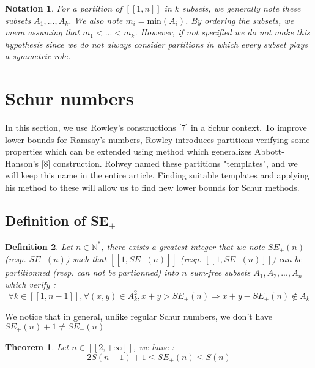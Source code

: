 \documentclass{article}
\newtheorem{definition}{Definition}[section]
\newtheorem{notation}[definition]{Notation}
\newtheorem{theorem}{Theorem}[section]
\newtheorem{computational theorem}{Computational Theorem}[theorem]
\begin{document}
\begin{notation}
For a partition of \([\![1, n]\!]\) in \(k\) subsets, we generally note these subsets \(A_1, ..., A_k\). We also note \(m_i = \text{min}(A_i)\). 
By ordering the subsets, we mean assuming that \(m_1 < ... < m_k\). However, if not specified we do not make this hypothesis since we 
do not always consider partitions in which every subset plays a symmetric role.
\end{notation}



\section{Schur numbers}

\qquad In this section, we use Rowley's constructions [7] in a Schur context. To improve lower bounds for Ramsay's numbers, Rowley 
introduces partitions verifying some properties which can be extended using method which generalizes Abbott-Hanson's [8] construction. 
Rolwey named these partitions "templates", and we will keep this name in the entire article. Finding suitable templates and applying his 
method to these will allow us to find new lower bounds for Schur methods.

\subsection{Definition of SE\(_+\)}

\begin{definition}
Let \( n \in \mathbb{N}^*\), there exists a greatest integer that we note \(SE_+(n)\) (resp. \(SE_-(n)\)) such that \( [\![1, SE_+(n)]\!]\) 
(resp. \( [\![1, SE_-(n)]\!]\)) can be partitionned (resp. can not be partionned) into \(n\) sum-free subsets \(A_1, A_2, ..., A_n\) which verify :
\[
\forall k \in [\![1, n-1]\!], \forall (x,y) \in A_k^2, x+y > SE_+(n)
\Longrightarrow x+y-SE_+(n) \notin A_k
\]
\end{definition}
We notice that in general, unlike regular Schur numbers, we don't have \(SE_+(n) + 1 \neq SE_-(n)\)

\begin{theorem}
Let \(n \in [\![2, +\infty]\!]\), we have :
\[
2S(n-1)+1 \leqslant SE_+(n) \leqslant S(n)
\]
\end{theorem}


\subsection{}
\end{document}
